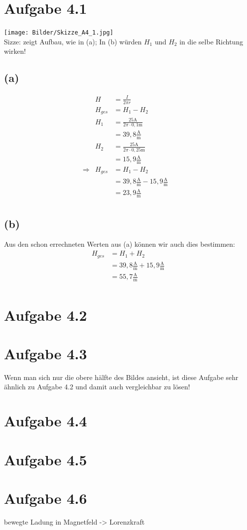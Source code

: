\documentclass[]{article}
\newcommand{\rarr}{\Rightarrow}
\newcommand{\unit}[1]{\text{#1}}
\newcommand{\fracunit}[2]{\frac{\unit{#1}}{\unit{#2}}}
\begin{document}
\section*{Aufgabe 4.1}
\par
	\texttt{[image: Bilder/Skizze\_A4\_1.jpg]}\\
	Sizze: zeigt Aufbau, wie in (a); In (b) würden $H_1$ und $H_2$ in die selbe Richtung wirken!
\subsection*{(a)}
	\begin{align*}
		&& H&= \frac{I}{2\pi r} &&\\
		&& H_{ges} &= H_1 - H_2 &&\\
		&& H_1 &= \frac{25\unit{A}}{2\pi \cdot 0,1\unit{m}}&&\\
		&& &= 39,8 \fracunit{A}{m}&&\\
		&& H_2 &= \frac{25\unit{A}}{2\pi \cdot 0,25\unit{m}}&&\\
		&& &= 15,9 \fracunit{A}{m}&&\\
		&\rarr& H_{ges} &= H_1 - H_2&&\\
		&& &= 39,8 \fracunit{A}{m} - 15,9 \fracunit{A}{m}&&\\
		&& &= 23,9 \fracunit{A}{m}&&\\
	\end{align*}
\subsection*{(b)}
	Aus den schon errechneten Werten aus (a) können wir auch dies bestimmen:
	\begin{align*}
		&& H_{ges} &= H_1 + H_2 &&\\
		&& &= 39,8 \fracunit{A}{m} + 15,9 \fracunit{A}{m}&&\\
		&& &= 55,7 \fracunit{A}{m}&&\\
	\end{align*}
\section*{Aufgabe 4.2}
\par
\section*{Aufgabe 4.3}
\par
Wenn man sich nur die obere hälfte des Bildes ansieht, ist diese Aufgabe sehr ähnlich zu Aufgabe 4.2 und damit auch vergleichbar zu lösen!
\section*{Aufgabe 4.4}
\par
\section*{Aufgabe 4.5}
\par
\section*{Aufgabe 4.6}
\par
bewegte Ladung in Magnetfeld -> Lorenzkraft
\end{document}
